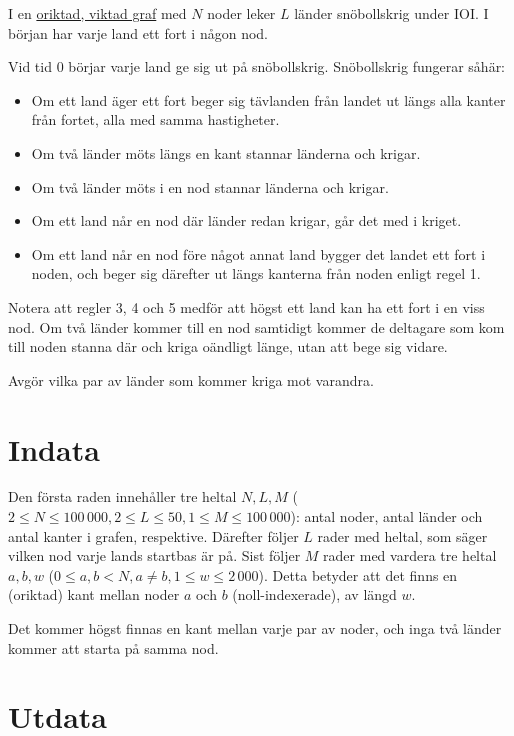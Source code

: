 I en \href{https://sv.wikipedia.org/wiki/Graf_(grafteori)}{oriktad, viktad graf}
med $N$ noder leker $L$ länder snöbollskrig under IOI.
I början har varje land ett fort i någon nod.

Vid tid $0$ börjar varje land ge sig ut på snöbollskrig. Snöbollskrig fungerar såhär:

\begin{itemize}
\item Om ett land äger ett fort beger sig tävlanden från landet ut längs alla kanter från fortet, alla med samma hastigheter.
\item Om två länder möts längs en kant stannar länderna och krigar.
\item Om två länder möts i en nod stannar länderna och krigar.
\item Om ett land når en nod där länder redan krigar, går det med i kriget.
\item Om ett land når en nod före något annat land bygger det landet ett fort i noden, och beger sig därefter ut längs kanterna från noden enligt regel 1.
\end{itemize}

Notera att regler 3, 4 och 5 medför att högst ett land kan ha ett fort i en viss nod.
Om två länder kommer till en nod samtidigt kommer de deltagare som kom till noden stanna där och kriga oändligt länge, utan att bege sig vidare.

Avgör vilka par av länder som kommer kriga mot varandra.

\section*{Indata}

Den första raden innehåller tre heltal $N,L,M$ ($2 \le N \le 100\,000, 2 \le L \le 50, 1 \le M \le 100\,000$):
antal noder, antal länder och antal kanter i grafen, respektive.
Därefter följer $L$ rader med heltal, som säger vilken nod varje lands startbas är på.
Sist följer $M$ rader med vardera tre heltal $a, b, w$ ($0 \le a,b < N, a \neq b, 1 \le w \le 2\,000$).
Detta betyder att det finns en (oriktad) kant mellan noder $a$ och $b$ (noll-indexerade), av längd $w$.

Det kommer högst finnas en kant mellan varje par av noder, och inga två länder kommer att starta på samma nod.

\section*{Utdata}

